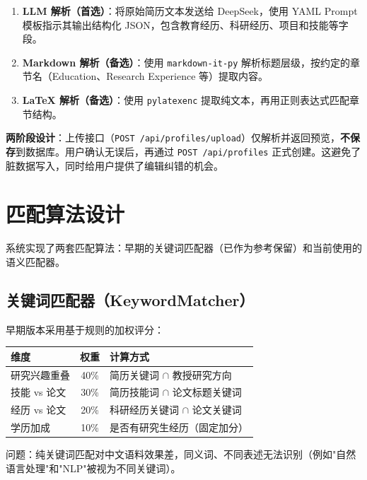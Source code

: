 \documentclass[11pt]{article}
\begin{document}
\begin{enumerate}
    \item \textbf{LLM 解析（首选）}：将原始简历文本发送给 DeepSeek，使用 YAML Prompt 模板指示其输出结构化 JSON，包含教育经历、科研经历、项目和技能等字段。
    \item \textbf{Markdown 解析（备选）}：使用 \texttt{markdown-it-py} 解析标题层级，按约定的章节名（Education、Research Experience 等）提取内容。
    \item \textbf{LaTeX 解析（备选）}：使用 \texttt{pylatexenc} 提取纯文本，再用正则表达式匹配章节结构。
\end{enumerate}

\textbf{两阶段设计}：上传接口（\texttt{POST /api/profiles/upload}）仅解析并返回预览，\textbf{不保存}到数据库。用户确认无误后，再通过 \texttt{POST /api/profiles} 正式创建。这避免了脏数据写入，同时给用户提供了编辑纠错的机会。

\section{匹配算法设计}

系统实现了两套匹配算法：早期的关键词匹配器（已作为参考保留）和当前使用的语义匹配器。

\subsection{关键词匹配器（KeywordMatcher）}

早期版本采用基于规则的加权评分：

\begin{center}
\begin{tabular}{|l|c|l|}
\hline
\textbf{维度} & \textbf{权重} & \textbf{计算方式} \\
\hline
研究兴趣重叠 & 40\% & 简历关键词 $\cap$ 教授研究方向 \\
技能 vs 论文 & 30\% & 简历技能词 $\cap$ 论文标题关键词 \\
经历 vs 论文 & 20\% & 科研经历关键词 $\cap$ 论文关键词 \\
学历加成 & 10\% & 是否有研究生经历（固定加分） \\
\hline
\end{tabular}
\end{center}

问题：纯关键词匹配对中文语料效果差，同义词、不同表述无法识别（例如"自然语言处理"和"NLP"被视为不同关键词）。
\end{document}
